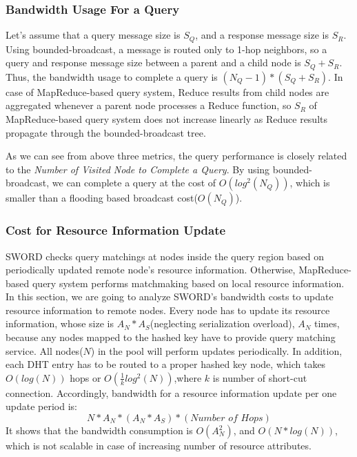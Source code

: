 \documentclass{acm_proc_article-sp}
\begin{document}
\subsubsection{Bandwidth Usage For a Query}
Let's assume that a query message size is $S_Q$, and a response message size is $S_R$.
Using bounded-broadcast, a message is routed only to 1-hop neighbors, so a query and response message size between a parent and a child node is $S_Q+S_R$.
Thus, the bandwidth usage to complete a query is \begin{math}(N_Q-1)*(S_Q+S_R)\end{math}.
In case of MapReduce-based query system, Reduce results from child nodes are aggregated whenever a parent node processes a Reduce function, so $S_R$ of MapReduce-based query system does not increase linearly
as Reduce results propagate through the bounded-broadcast tree.

As we can see from above three metrics, the query performance is closely related to the \textit{Number of Visited Node to Complete a Query}. By using bounded-broadcast, we can complete a query
at the cost of \begin{math}O(log^2(N_Q))\end{math}, which is smaller than a flooding based broadcast cost(\begin{math}O(N_Q)\end{math}).
\subsubsection{Cost for Resource Information Update}
SWORD checks query matchings at nodes inside the query region based on periodically updated remote node's resource information.
Otherwise, MapReduce-based query system performs matchmaking based on local resource information.
In this section, we are going to analyze SWORD's bandwidth costs to update resource information to remote nodes.
Every node has to update its resource information, whose size is $A_N*A_S$(neglecting serialization overload), $A_N$ times, because any nodes mapped to the hashed key have to provide query matching service. 
All nodes($N$) in the pool will perform updates periodically.
In addition, each DHT entry has to be routed to a proper hashed key node, which takes $O(log(N))$ hops\cite{chord}\cite{pastry} or \begin{math}O(\frac{1}{k}log^2(N))\end{math},where $k$ is number of short-cut connection\cite{brunet}.
Accordingly, bandwidth for a resource information update per one update period is:
\begin{displaymath}N*A_N*(A_N*A_S)*(\textit{Number of Hops})\end{displaymath}
It shows that the bandwidth consumption is $O(A_N^2)$, and $O(N*log(N))$, which is not scalable in case of increasing number of resource attributes.
\end{document}
